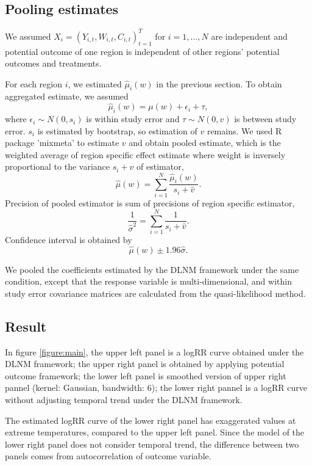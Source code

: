 \documentclass[12pt]{article}
\begin{document}
\subsection{Pooling estimates}

We assumed $X_i = (Y_{i,t}, W_{i,t}, C_{i,t})_{t = 1}^T$ for $i = 1, \dots, N$ are independent
and potential outcome of one region is independent of other regions' potential outcomes and treatments.

For each region $i$, we estimated $\hat{\mu}_i(w)$ in the previous section.
To obtain aggregated estimate, we assumed
\[
	\hat{\mu}_i(w) = \mu(w) + \epsilon_i + \tau,
\]
where $\epsilon_i \sim N(0, s_i)$ is within study error and $\tau \sim N(0, v)$ is between study error.
$s_i$ is estimated by bootstrap,
so estimation of $v$ remains.
We used R package 'mixmeta' to estimate $v$ and obtain pooled estimate,
which is the weighted average of region specific effect estimate
where weight is inversely proportional to the variance $s_i + v$ of estimator,
\[
	\hat{\mu}(w) = \sum_{i = 1}^N \frac{\hat{\mu}_i(w)}{s_i + \hat{v}}.
\]
Precision of pooled estimator is sum of precisions of region specific estimator,
\[
	\frac{1}{\hat{\sigma}^2} = \sum_{i = 1}^N \frac{1}{s_i + \hat{v}}.
\]
Confidence interval is obtained by 
\[
	\hat{\mu}(w) \pm 1.96 \hat{\sigma}.
\]

We pooled the coefficients estimated by the DLNM framework under the same condition,
except that the response variable is multi-dimensional, 
and within study error covariance matrices are calculated from the quasi-likelihood method.

\subsection{Result}

In figure \ref{figure:main},
the upper left panel is a logRR curve obtained under the DLNM framework;
the upper right panel is obtained by applying potential outcome framework;
the lower left panel is smoothed version of upper right pannel (kernel: Gaussian, bandwidth: $6$);
the lower right pannel is a logRR curve without adjusting temporal trend under the DLNM framework.

The estimated logRR curve of the lower right panel has exaggerated values at extreme temperatures,
compared to the upper left panel.
Since the model of the lower right panel does not consider temporal trend,
the difference between two panels comes from autocorrelation of outcome variable.
\end{document}
